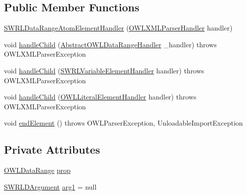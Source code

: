 \subsection*{Public Member Functions}
\begin{DoxyCompactItemize}
\item 
\hyperlink{classorg_1_1coode_1_1owlapi_1_1owlxmlparser_1_1_s_w_r_l_data_range_atom_element_handler_ac2d88be84e0e8cdf1cbbf50f04b472e5}{S\-W\-R\-L\-Data\-Range\-Atom\-Element\-Handler} (\hyperlink{classorg_1_1coode_1_1owlapi_1_1owlxmlparser_1_1_o_w_l_x_m_l_parser_handler}{O\-W\-L\-X\-M\-L\-Parser\-Handler} handler)
\item 
void \hyperlink{classorg_1_1coode_1_1owlapi_1_1owlxmlparser_1_1_s_w_r_l_data_range_atom_element_handler_ad7b63f1ce272e4c289ed27a8eec3233b}{handle\-Child} (\hyperlink{classorg_1_1coode_1_1owlapi_1_1owlxmlparser_1_1_abstract_o_w_l_data_range_handler}{Abstract\-O\-W\-L\-Data\-Range\-Handler} \-\_\-handler)  throws O\-W\-L\-X\-M\-L\-Parser\-Exception 
\item 
void \hyperlink{classorg_1_1coode_1_1owlapi_1_1owlxmlparser_1_1_s_w_r_l_data_range_atom_element_handler_a7fa28061236c2515726a19d1a567ac34}{handle\-Child} (\hyperlink{classorg_1_1coode_1_1owlapi_1_1owlxmlparser_1_1_s_w_r_l_variable_element_handler}{S\-W\-R\-L\-Variable\-Element\-Handler} handler)  throws O\-W\-L\-X\-M\-L\-Parser\-Exception 
\item 
void \hyperlink{classorg_1_1coode_1_1owlapi_1_1owlxmlparser_1_1_s_w_r_l_data_range_atom_element_handler_a508fa0802f6ed006046f5cae1b0d5406}{handle\-Child} (\hyperlink{classorg_1_1coode_1_1owlapi_1_1owlxmlparser_1_1_o_w_l_literal_element_handler}{O\-W\-L\-Literal\-Element\-Handler} handler)  throws O\-W\-L\-X\-M\-L\-Parser\-Exception 
\item 
void \hyperlink{classorg_1_1coode_1_1owlapi_1_1owlxmlparser_1_1_s_w_r_l_data_range_atom_element_handler_a42425dba8ebb6c572e20547456592760}{end\-Element} ()  throws O\-W\-L\-Parser\-Exception, Unloadable\-Import\-Exception 
\end{DoxyCompactItemize}
\subsection*{Private Attributes}
\begin{DoxyCompactItemize}
\item 
\hyperlink{interfaceorg_1_1semanticweb_1_1owlapi_1_1model_1_1_o_w_l_data_range}{O\-W\-L\-Data\-Range} \hyperlink{classorg_1_1coode_1_1owlapi_1_1owlxmlparser_1_1_s_w_r_l_data_range_atom_element_handler_a1ecded6cb1cacdbaecf453a46b8c0b40}{prop}
\item 
\hyperlink{interfaceorg_1_1semanticweb_1_1owlapi_1_1model_1_1_s_w_r_l_d_argument}{S\-W\-R\-L\-D\-Argument} \hyperlink{classorg_1_1coode_1_1owlapi_1_1owlxmlparser_1_1_s_w_r_l_data_range_atom_element_handler_ac21abdf602431602bd6734c35e09c5ab}{arg1} = null
\end{DoxyCompactItemize}


